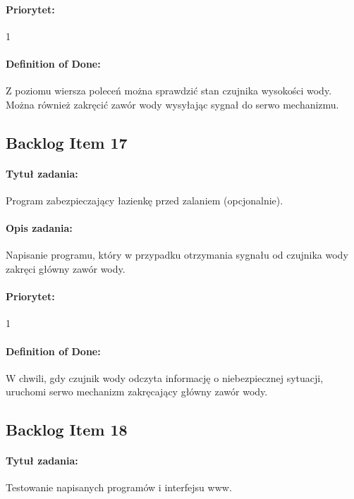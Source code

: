 	\paragraph{Priorytet:} 
	1
	
	\paragraph{Definition of Done:}
	Z poziomu wiersza poleceń można sprawdzić stan czujnika wysokości wody. Można również zakręcić zawór wody wysyłając sygnał do serwo mechanizmu.


	\subsection{Backlog Item 17}
	\paragraph{Tytuł zadania:}
	Program zabezpieczający łazienkę przed zalaniem (opcjonalnie).
	
	\paragraph{Opis zadania:} 
	Napisanie programu, który w przypadku otrzymania sygnału od czujnika wody zakręci główny zawór wody. 
	
	\paragraph{Priorytet:} 
	1
	
	\paragraph{Definition of Done:}
	W chwili, gdy czujnik wody odczyta informację o niebezpiecznej sytuacji, uruchomi serwo mechanizm zakręcający główny zawór wody.


\subsection{Backlog Item 18}
\paragraph{Tytuł zadania:}
Testowanie napisanych programów i interfejsu www.

